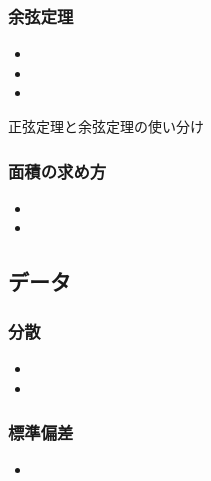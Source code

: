 \documentclass[10pt,dvipdfmx]{jsarticle}
\begin{document}
\subsubsection*{余弦定理}
\begin{LARGE}
  \begin{itemize}
    \item  \item  \item
  \end{itemize}
\end{LARGE}

\begin{itembox}[l]{正弦定理と余弦定理の使い分け}
  \vspace{8mm}
\end{itembox}


\subsubsection*{面積の求め方}
\begin{multicols}{2}
  \begin{LARGE}
    \begin{itemize}
      \item  \item
    \end{itemize}
  \end{LARGE}
\end{multicols}


\subsection*{データ}
\subsubsection*{分散}
\begin{LARGE}
  \begin{itemize}
    \item \item
  \end{itemize}
\end{LARGE}

\subsubsection*{標準偏差}
\begin{LARGE}
  \begin{itemize}
    \item
  \end{itemize}
\end{LARGE}
\end{document}
